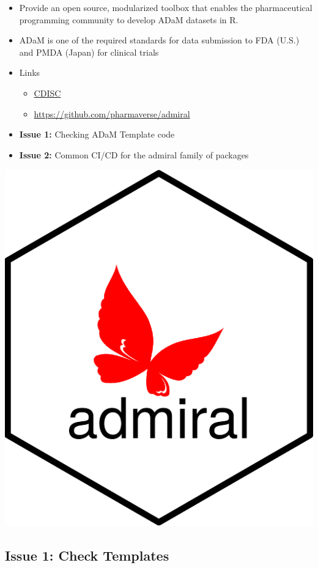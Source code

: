 \documentclass[
  letterpaper,
  DIV=11,
  numbers=noendperiod]{scrartcl}
\providecommand{\tightlist}{%
  \setlength{\itemsep}{0pt}\setlength{\parskip}{0pt}}\usepackage{longtable,booktabs,array}
\begin{document}
\begin{itemize}
\tightlist
\item
  Provide an open source, modularized toolbox that enables the
  pharmaceutical programming community to develop ADaM datasets in R.
\item
  ADaM is one of the required standards for data submission to FDA
  (U.S.) and PMDA (Japan) for clinical trials
\item
  Links

  \begin{itemize}
  \tightlist
  \item
    \href{https://www.cdisc.org/}{CDISC}
  \item
    \url{https://github.com/pharmaverse/admiral}
  \end{itemize}
\item
  \textbf{Issue 1:} Checking ADaM Template code
\item
  \textbf{Issue 2:} Common CI/CD for the admiral family of packages
\end{itemize}

\includegraphics{hex-admiral.png}

\hypertarget{issue-1-check-templates}{%
\subsection{Issue 1: Check Templates}\label{issue-1-check-templates}}
\end{document}
